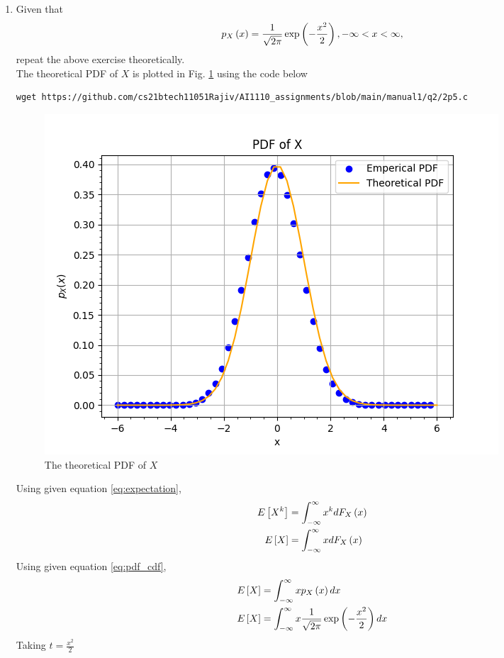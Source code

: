 \documentclass[journal,12pt,twocolumn]{IEEEtran}
\renewcommand\thesection{\arabic{section}}
\begin{document}
\begin{enumerate}[label=\thesection.\arabic*
,ref=\thesection.\theenumi]
\begin{align}
\text{var}\sbrak{X}  = 0.999560
\end{align}
%
\item Given that 
\begin{align}
p_{X}\left(x\right) = \frac{1}{\sqrt{2\pi}}\exp\left(-\frac{x^2}{2}\right), -\infty < x < \infty,
\end{align}
repeat the above exercise theoretically.
\\
\solution The theoretical PDF of $X$ is plotted in Fig. \ref{fig:theory_gauss_pdf} using the code below
\begin{lstlisting}
wget https://github.com/cs21btech11051Rajiv/AI1110_assignments/blob/main/manual1/q2/2p5.c
\end{lstlisting}
\begin{figure}
\centering
\includegraphics[width=\columnwidth]{./figs/fig2.5.png}
\caption{The theoretical PDF of $X$}
\label{fig:theory_gauss_pdf}
\end{figure}
Using given equation \eqref{eq:expectation},
\begin{align}
    E{}\left[X^k\right] &= \int_{-\infty}^{\infty}x^kdF_{X}\left(x\right) \\
    E{}\left[X\right] &= \int_{-\infty}^{\infty}x dF_{X}\left(x\right) 
\end{align}
Using given equation \eqref{eq:pdf_cdf},
\begin{align}
    E{}\left[X\right] &= \int_{-\infty}^{\infty}x p_{X}\left(x\right) dx \\
    E{}\left[X\right] &= \int_{-\infty}^{\infty}x
    \frac{1}{\sqrt{2\pi}}\exp\left(-\frac{x^2}{2}\right) dx    
\end{align}
Taking $t = \frac{x^2}{2}$
\begin{align}

\end{align}
\end{enumerate}
\end{document}

